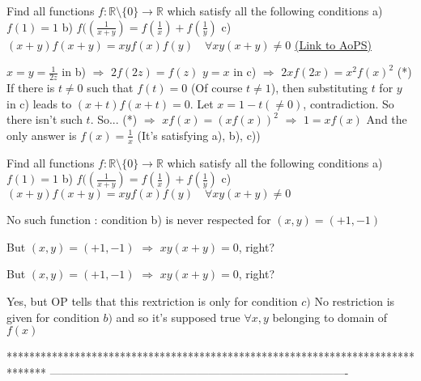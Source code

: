 \begin{problem}
	Find all functions $f:\mathbb{R}\setminus \{0\}\to\mathbb{R}$ which satisfy all the following conditions
a) $f(1)=1$
b) $f(\left(\frac{1}{x+y}\right)=f\left(\frac{1}{x}\right)+f\left(\frac{1}{y}\right)$
c) $(x+y)f(x+y)=xyf(x)f(y)\quad \forall xy(x+y)\neq 0$
	\flushright \href{https://artofproblemsolving.com/community/c6h578347}{(Link to AoPS)}
\end{problem}



\begin{solution}
	$x=y=\frac{1}{2z}$ in b) $\Rightarrow$ $2f(2z)=f(z)$
$y=x$ in c) $\Rightarrow$ $2xf(2x)=x^{2}f(x)^{2}$ (*)
If there is $t\neq 0$ such that $f(t)=0$ (Of course $t\neq 1$), then substituting $t$ for $y$ in c) leads to $(x+t)f(x+t)=0$.
Let $x=1-t(\neq 0)$, contradiction.
So there isn't such $t$. So...
(*) $\Rightarrow$ $xf(x)=(xf(x))^2$ $\Rightarrow$ $1=xf(x)$
And the only answer is $f(x)=\frac{1}{x}$ (It's satisfying a), b), c))
\end{solution}



\begin{solution}
	\begin{tcolorbox}Find all functions $f:\mathbb{R}\setminus \{0\}\to\mathbb{R}$ which satisfy all the following conditions
a) $f(1)=1$
b) $f(\left(\frac{1}{x+y}\right)=f\left(\frac{1}{x}\right)+f\left(\frac{1}{y}\right)$
c) $(x+y)f(x+y)=xyf(x)f(y)\quad \forall xy(x+y)\neq 0$\end{tcolorbox}
No such function : condition b) is never respected for $(x,y)=(+1,-1)$
\end{solution}



\begin{solution}
	But $(x,y)=(+1, -1)$ $\Rightarrow$ $xy(x+y)=0$, right?
\end{solution}



\begin{solution}
	\begin{tcolorbox}But $(x,y)=(+1, -1)$ $\Rightarrow$ $xy(x+y)=0$, right?\end{tcolorbox}
Yes, but OP tells that this rextriction is only for condition $c)$
No restriction is given for condition $b)$ and so it's supposed true $\forall x,y$ belonging to domain of $f(x)$
\end{solution}
*******************************************************************************
-------------------------------------------------------------------------------

